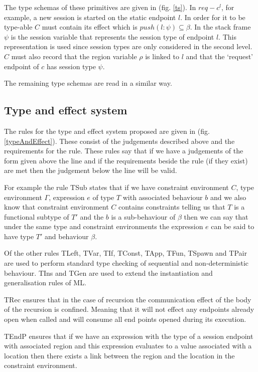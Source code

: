The type schemas of these primitives are given in (fig. \ref{ts}). In $req-c^l$, for example, a new session is started on the static endpoint $l$. In order for it to be type-able $C$ must contain its effect which is $push(l:\psi) \subseteq \beta$. In the stack frame $\psi$ is the session variable that represents the session type of endpoint $l$. This representation is used since session types are only considered in the second level. $C$ must also record that the region variable $\rho$ is linked to $l$ and that the `request' endpoint of $c$ has session type $\psi$. 

The remaining type schemas are read in a similar way. 


\subsection{Type and effect system} 

The rules for the type and effect system proposed are given in (fig. \ref{typeAndEffect}). These consist of the judgements described above and the requirements for the rule. These rules say that if we have a judgements of the form given above the line and if the requirements beside the rule (if they exist) are met then the judgement below the line will be valid.

For example the rule TSub states that if we have constraint environment $C$, type environment $\Gamma$, expression $e$ of type $T$ with associated behaviour $b$ and we also know that constraint environment $C$ contains constraints telling us that $T$ is a functional subtype of $T'$ and the $b$ is a sub-behaviour of $\beta$ then we can say that under the same type and constraint environments the expression $e$ can be said to have type $T'$ and behaviour $\beta$.

Of the other rules TLeft, TVar, TIf, TConst, TApp, TFun, TSpawn and TPair are used to perform standard type checking of sequential and non-deterministic behaviour. TIns and TGen are used to extend the instantiation and generalisation rules of ML. 

TRec ensures that in the case of recursion the communication effect of the body of the recursion is confined. Meaning that it will not effect any endpoints already open when called and will consume all end points opened during its execution. 

TEndP ensures that if we have an expression with the type of a session endpoint with associated region and this expression evaluates to a value associated with a location then there exists a link between the region and the location in the constraint environment. 

